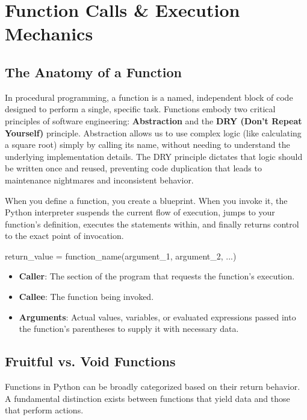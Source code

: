 \section{Function Calls \& Execution Mechanics}

\subsection{The Anatomy of a Function}
In procedural programming, a function is a named, independent block of code designed to perform a single, specific task. Functions embody two critical principles of software engineering: \textbf{Abstraction} and the \textbf{DRY (Don't Repeat Yourself)} principle. Abstraction allows us to use complex logic (like calculating a square root) simply by calling its name, without needing to understand the underlying implementation details. The DRY principle dictates that logic should be written once and reused, preventing code duplication that leads to maintenance nightmares and inconsistent behavior.

When you define a function, you create a blueprint. When you invoke it, the Python interpreter suspends the current flow of execution, jumps to your function's definition, executes the statements within, and finally returns control to the exact point of invocation.

\begin{syntaxbox}
return\_value = function\_name(argument\_1, argument\_2, ...)
\end{syntaxbox}

\begin{itemize}[leftmargin=1.5em]
    \item \textbf{Caller}: The section of the program that requests the function's execution.
    \item \textbf{Callee}: The function being invoked.
    \item \textbf{Arguments}: Actual values, variables, or evaluated expressions passed into the function's parentheses to supply it with necessary data.
\end{itemize}

\subsection{Fruitful vs. Void Functions}
Functions in Python can be broadly categorized based on their return behavior. A fundamental distinction exists between functions that yield data and those that perform actions.

